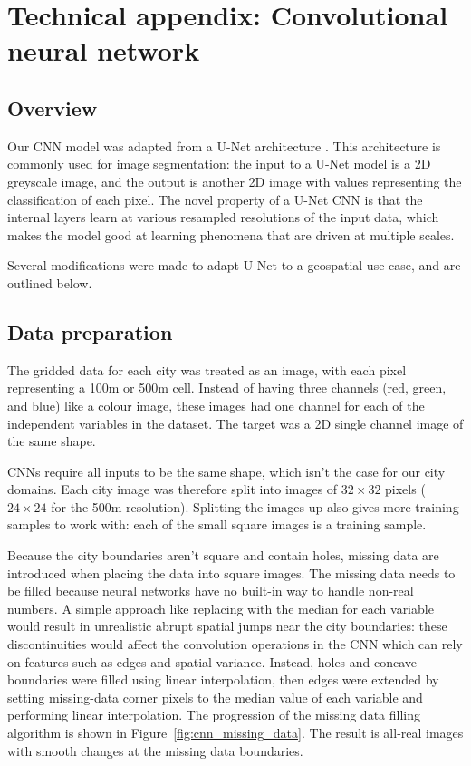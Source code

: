 \documentclass[final,3p,times,onecolumn,sort&compress]{elsarticle}
\begin{document}
\newpage
\section{Technical appendix: Convolutional neural network}
\label{ss:cnn}
\subsection{Overview}

Our CNN model was adapted from a U-Net architecture \citep{unet}. This architecture is commonly used for image segmentation: the input to a U-Net model is a 2D greyscale image, and the output is another 2D image with values representing the classification of each pixel. The novel property of a U-Net CNN is that the internal layers learn at various resampled resolutions of the input data, which makes the model good at learning phenomena that are driven at multiple scales.

Several modifications were made to adapt U-Net to a geospatial use-case, and are outlined below.


\subsection{Data preparation}

The gridded data for each city was treated as an image, with each pixel representing a 100m or 500m cell. Instead of having three channels (red, green, and blue) like a colour image, these images had one channel for each of the independent variables in the dataset. The target was a 2D single channel image of the same shape.

CNNs require all inputs to be the same shape, which isn't the case for our city domains. Each city image was therefore split into images of $32 \times 32$ pixels ($24 \times 24$ for the 500m resolution). Splitting the images up also gives more training samples to work with: each of the small square images is a training sample.

Because the city boundaries aren't square and contain holes, missing data are introduced when placing the data into square images. The missing data needs to be filled because neural networks have no built-in way to handle non-real numbers. A simple approach like replacing with the median for each variable would result in unrealistic abrupt spatial jumps near the city boundaries: these discontinuities would affect the convolution operations in the CNN which can rely on features such as edges and spatial variance. Instead, holes and concave boundaries were filled using linear interpolation, then edges were extended by setting missing-data corner pixels to the median value of each variable and performing linear interpolation. The progression of the missing data filling algorithm is shown in Figure~\ref{fig:cnn_missing_data}. The result is all-real images with smooth changes at the missing data boundaries.
\end{document}
